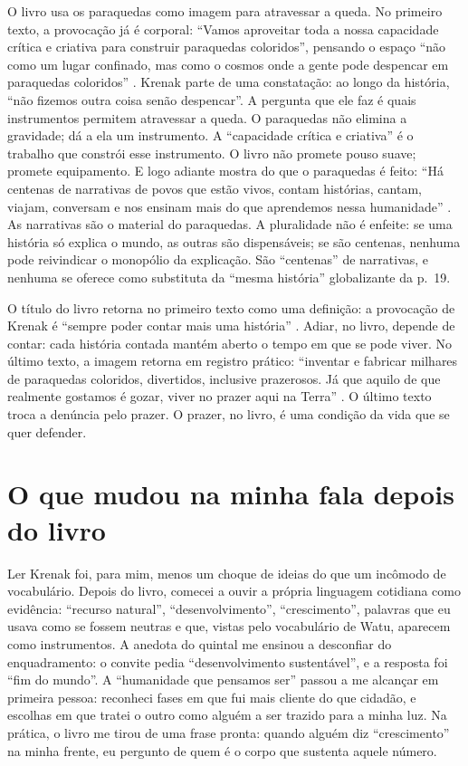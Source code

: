 \documentclass[12pt]{article}
\begin{document}
O livro usa os paraquedas como imagem para atravessar a queda. No primeiro texto, a provocação já é corporal: ``Vamos aproveitar toda a nossa capacidade crítica e criativa para construir paraquedas coloridos'', pensando o espaço ``não como um lugar confinado, mas como o cosmos onde a gente pode despencar em paraquedas coloridos'' \cite[p. 30]{krenak2019}. Krenak parte de uma constatação: ao longo da história, ``não fizemos outra coisa senão despencar''. A pergunta que ele faz é quais instrumentos permitem atravessar a queda. O paraquedas não elimina a gravidade; dá a ela um instrumento. A ``capacidade crítica e criativa'' é o trabalho que constrói esse instrumento. O livro não promete pouso suave; promete equipamento. E logo adiante mostra do que o paraquedas é feito: ``Há centenas de narrativas de povos que estão vivos, contam histórias, cantam, viajam, conversam e nos ensinam mais do que aprendemos nessa humanidade'' \cite[p. 30]{krenak2019}. As narrativas são o material do paraquedas. A pluralidade não é enfeite: se uma história só explica o mundo, as outras são dispensáveis; se são centenas, nenhuma pode reivindicar o monopólio da explicação. São ``centenas'' de narrativas, e nenhuma se oferece como substituta da ``mesma história'' globalizante da p.~19.

O título do livro retorna no primeiro texto como uma definição: a provocação de Krenak é ``sempre poder contar mais uma história'' \cite[p. 27]{krenak2019}. Adiar, no livro, depende de contar: cada história contada mantém aberto o tempo em que se pode viver. No último texto, a imagem retorna em registro prático: ``inventar e fabricar milhares de paraquedas coloridos, divertidos, inclusive prazerosos. Já que aquilo de que realmente gostamos é gozar, viver no prazer aqui na Terra'' \cite[p. 63]{krenak2019}. O último texto troca a denúncia pelo prazer. O prazer, no livro, é uma condição da vida que se quer defender.

\section{O que mudou na minha fala depois do livro}

Ler Krenak foi, para mim, menos um choque de ideias do que um incômodo de vocabulário. Depois do livro, comecei a ouvir a própria linguagem cotidiana como evidência: ``recurso natural'', ``desenvolvimento'', ``crescimento'', palavras que eu usava como se fossem neutras e que, vistas pelo vocabulário de Watu, aparecem como instrumentos. A anedota do quintal me ensinou a desconfiar do enquadramento: o convite pedia ``desenvolvimento sustentável'', e a resposta foi ``fim do mundo''. A ``humanidade que pensamos ser'' passou a me alcançar em primeira pessoa: reconheci fases em que fui mais cliente do que cidadão, e escolhas em que tratei o outro como alguém a ser trazido para a minha luz. Na prática, o livro me tirou de uma frase pronta: quando alguém diz ``crescimento'' na minha frente, eu pergunto de quem é o corpo que sustenta aquele número.
\end{document}
